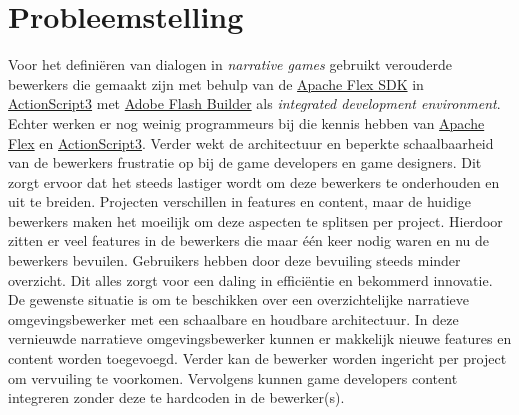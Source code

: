 \section{Probleemstelling}
Voor het definiëren van dialogen in \emph{narrative games} gebruikt \organisation{} verouderde bewerkers die gemaakt zijn met behulp van de \href{https://en.wikipedia.org/wiki/Apache_Flex}{Apache Flex SDK} in \href{http://www.adobe.com/devnet/actionscript/articles/actionscript3_overview.html}{ActionScript3} met \href{https://en.wikipedia.org/wiki/Adobe_Flash_Builder}{Adobe Flash Builder} als \emph{integrated development environment}.
Echter werken er nog weinig programmeurs bij \organisation die kennis hebben van \href{https://en.wikipedia.org/wiki/Apache_Flex}{Apache Flex} en \href{http://www.adobe.com/devnet/actionscript/articles/actionscript3_overview.html}{ActionScript3}.
Verder wekt de architectuur en beperkte schaalbaarheid van de bewerkers frustratie op bij de game developers en game designers.
Dit zorgt ervoor dat het steeds lastiger wordt om deze bewerkers te onderhouden en uit te breiden.
Projecten verschillen in features en content, maar de huidige bewerkers maken het moeilijk om deze aspecten te splitsen per project.
Hierdoor zitten er veel features in de bewerkers die maar één keer nodig waren en nu de bewerkers bevuilen.
Gebruikers hebben door deze bevuiling steeds minder overzicht.
Dit alles zorgt voor een daling in efficiëntie en bekommerd innovatie.
De gewenste situatie is om te beschikken over een overzichtelijke narratieve omgevingsbewerker met een schaalbare en houdbare architectuur.
In deze vernieuwde narratieve omgevingsbewerker kunnen er makkelijk nieuwe features en content worden toegevoegd.
Verder kan de bewerker worden ingericht per project om vervuiling te voorkomen.
Vervolgens kunnen game developers content integreren zonder deze te hardcoden in de bewerker(s).

